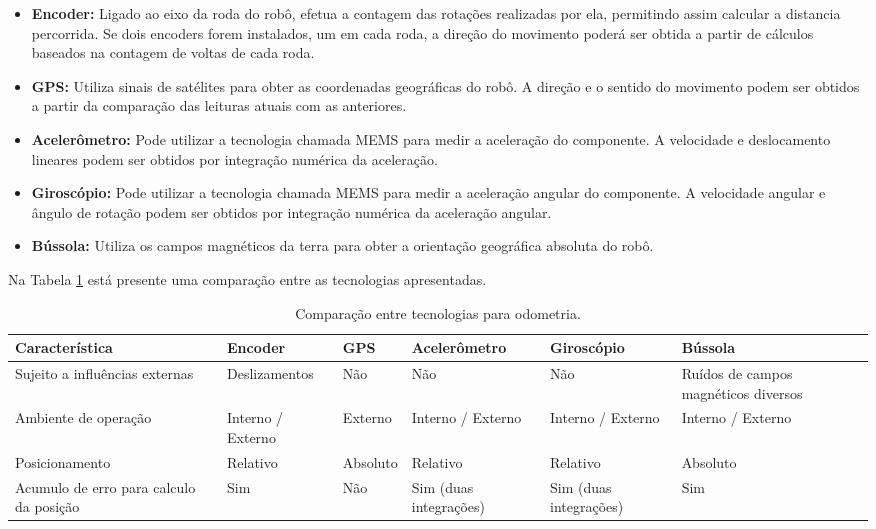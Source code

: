\begin{itemize}
  \item \textbf{Encoder:} Ligado ao eixo da roda do robô, efetua a contagem das rotações realizadas por ela, permitindo assim calcular a distancia percorrida. Se dois encoders forem instalados, um em cada roda, a direção do movimento poderá ser obtida a partir de cálculos baseados na contagem de voltas de cada roda.
  \item \textbf{GPS:} Utiliza sinais de satélites para obter as coordenadas geográficas do robô. A direção e o sentido do movimento podem ser obtidos a partir da comparação das leituras atuais com as anteriores.
  \item 	\textbf{Acelerômetro:} Pode utilizar a tecnologia chamada MEMS para medir a aceleração do componente. A velocidade e deslocamento lineares podem ser obtidos por integração numérica da aceleração.
  \item 	\textbf{Giroscópio:} Pode utilizar a tecnologia chamada MEMS para medir a aceleração angular do componente. A velocidade angular e ângulo de rotação podem ser obtidos por integração numérica da aceleração angular.
  \item 	\textbf{Bússola:} Utiliza os campos magnéticos da terra para obter a orientação geográfica absoluta do robô.
\end{itemize}

Na Tabela \ref{tab:alternativas_tecnologias_odometria} está presente uma comparação entre as tecnologias apresentadas. 

\begin{table}[h]
  \caption{Comparação entre tecnologias para odometria.}
  \centering
  \begin{tabular}{p{3cm}|p{2.2cm}p{1.7cm}p{2.2cm}p{2.2cm}p{2.2cm}}
    \toprule
    \textbf{Característica} & \textbf{Encoder} & \textbf{GPS} & \textbf{Acelerômetro} & \textbf{Giroscópio} & \textbf{Bússola} \\
    \hline
    Sujeito a influências externas & Deslizamentos & Não & Não & Não & Ruídos de campos magnéticos diversos \\
    \hline
    Ambiente de operação & Interno / Externo & Externo & Interno / Externo & Interno / Externo & Interno / Externo \\
    \hline
    Posicionamento & Relativo & Absoluto & Relativo & Relativo & Absoluto \\
    \hline
    Acumulo de erro para calculo da posição & Sim & Não & Sim (duas integrações) & Sim (duas integrações) & Sim \\
    \bottomrule
  \end{tabular}
  \label{tab:alternativas_tecnologias_odometria}
\end{table}

